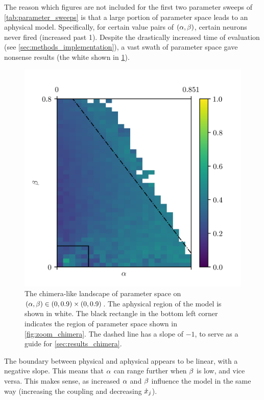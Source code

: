 The reason which figures are not included for the first two parameter sweeps of \cref{tab:parameter_sweeps} is that a large portion of parameter space leads to an aphysical model.
Specifically, for certain value pairs of $\pqty{\hra, \hrb}$, certain neurons never fired (increased past 1).
Despite the drastically increased time of evaluation (see \cref{sec:methods_implementation}), a vast swath of parameter space gave nonsense results (the white shown in \cref{fig:aphysical_chimera}).
\begin{figure}[ht]
  \centering
  \includegraphics{figure/aphysical_chimera}
  \caption[Chimera-like index landscape]{
    The chimera-like landscape of parameter space on $\pqty{\hra, \hrb} \in \pqty{0, 0.9} \times \pqty{0, 0.9}$.
    The aphysical region of the model is shown in white.
    The black rectangle in the bottom left corner indicates the region of parameter space shown in \cref{fig:zoom_chimera}.
    The dashed line has a slope of $-1$, to serve as a guide for \cref{sec:results_chimera}.
  }
  \label{fig:aphysical_chimera}
\end{figure}
The boundary between physical and aphysical appears to be linear, with a negative slope.
This means that $\alpha$ can range further when $\beta$ is low,
and vice versa.
This makes sense, as increased $\alpha$ and $\beta$ influence the model in the same way (increasing the coupling and decreasing $\dot{x}_{j}$).

